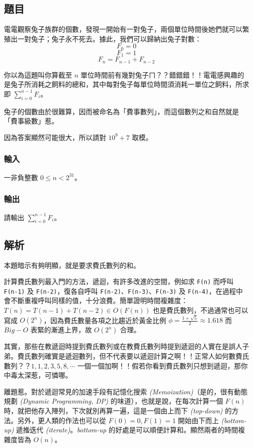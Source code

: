 \documentclass[a4paper,10pt]{article}
\begin{document}
\subsection{題目}

電電觀察兔子族群的個數，發現一開始有一對兔子，兩個單位時間後她們就可以繁殖出一對兔子；兔子永不死去。據此，我們可以歸納出兔子對數：
$$ F_0 = 0 $$
$$ F_1 = 1 $$
$$ F_n = F_{n-1} + F_{n-2} $$

你以為這題叫你算截至 $n$ 單位時間前有幾對兔子ㄇ？？錯錯錯！！電電感興趣的是兔子所消耗之飼料的總和，其中每對兔子每單位時間須消耗一單位之飼料，所求即 $\sum_{i=0}^{n-1}{F_i}$。

兔子的個數由於很難算，因而被命名為「費事數列」，而這個數列之和自然就是「費事級數」惹。

因為答案顯然可能很大，所以請對 $10^9+7$ 取模。

\subsubsection{輸入}

一非負整數 $0 \leq n < 2^{31}$。

\subsubsection{輸出}

請輸出 $\displaystyle\sum_{i=0}^{n-1}{F_i}$。

\subsection{解析}

本題暗示有夠明顯，就是要求費氏數列的和。

計算費氏數列最入門的方法，遞迴，有許多改進的空間，例如求 \texttt{F(n)} 而呼叫 \texttt{F(n-1)} 及 \texttt{F(n-2)}，復各自呼叫 \texttt{F(n-2)}、\texttt{F(n-3)}、\texttt{F(n-3)} 及 \texttt{F(n-4)}，在過程中會不斷重複呼叫同樣的值，十分浪費。簡單證明時間複雜度：$T(n) = T(n-1) + T(n-2) \in O(F(n))$ 也是費氏數列，不過通常也可以寫成 $O(2^n)$，因為費氏數量各項之比趨近於黃金比例 $\phi = \frac{1+\sqrt{5}}{2} \approx 1.618$ 而 $Big-O$ 表緊的漸進上界，故 $O(2^n)$ 合理。

其實，那些在教遞迴時提到費氏數列或在教費氏數列時提到遞迴的人實在是誤人子弟。費氏數列確實是遞迴數列，但不代表要以遞迴計算之啊！！正常人如何數費氏數列？？$1, 1, 2, 3, 5, 8, \cdots$ 一個一個加啊！！假若你看到費氏數列只想到遞迴，那你中毒太深惹，可憐哪。

離題惹。對於遞迴常見的加速手段有記憶化搜索 \textit{(Memoization)}（是的，很有動態規劃 \textit{(Dynamic Programming, DP)} 的味道），也就是說，在每次計算一個 $F(n)$ 時，就把他存入陣列，下次就別再算一遍，這是一個由上而下 \textit{(top-down)} 的方法。另外，更人類的作法也可以從 $F(0) = 0, F(1) = 1$ 開始由下而上 \textit{(bottom-up)} 遞推∕迭代 \textit{(iterate)}。\textit{bottom-up} 的好處是可以順便計算和。顯然兩者的時間複雜度皆為 $O(n)$。
\end{document}
